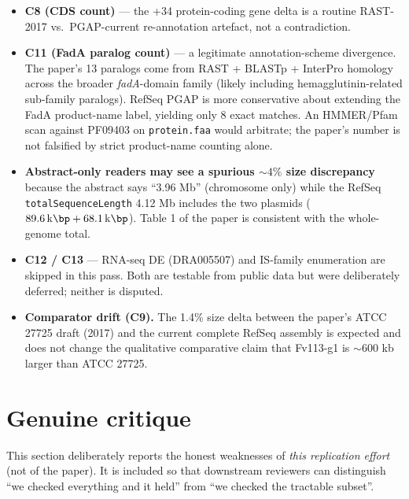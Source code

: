 \documentclass[11pt]{article}
\begin{document}
\begin{itemize}
  \item \textbf{C8 (CDS count)} --- the +34 protein-coding gene delta is a routine
        RAST-2017 vs.\ PGAP-current re-annotation artefact, not a contradiction.
  \item \textbf{C11 (FadA paralog count)} --- a legitimate annotation-scheme divergence.
        The paper's 13 paralogs come from RAST + BLASTp + InterPro homology across the
        broader \emph{fadA}-domain family (likely including hemagglutinin-related
        sub-family paralogs). RefSeq PGAP is more conservative about extending the FadA
        product-name label, yielding only 8 exact matches. An HMMER/Pfam scan against
        PF09403 on \texttt{protein.faa} would arbitrate; the paper's number is not
        falsified by strict product-name counting alone.
  \item \textbf{Abstract-only readers may see a spurious ${\sim}4\%$ size discrepancy}
        because the abstract says ``3.96 Mb'' (chromosome only) while the RefSeq
        \texttt{totalSequenceLength} 4.12 Mb includes the two plasmids
        ($\SI{89.6}{\kilo\bp} + \SI{68.1}{\kilo\bp}$). Table 1 of the paper is consistent
        with the whole-genome total.
  \item \textbf{C12 / C13} --- RNA-seq DE (DRA005507) and IS-family enumeration are
        skipped in this pass. Both are testable from public data but were deliberately
        deferred; neither is disputed.
  \item \textbf{Comparator drift (C9).} The 1.4\% size delta between the paper's
        ATCC 27725 draft (2017) and the current complete RefSeq assembly is expected and
        does not change the qualitative comparative claim that Fv113-g1 is ${\sim}600$ kb
        larger than ATCC 27725.
\end{itemize}

\section{Genuine critique}

This section deliberately reports the honest weaknesses of \emph{this replication effort}
(not of the paper). It is included so that downstream reviewers can distinguish
``we checked everything and it held'' from ``we checked the tractable subset''.
\end{document}
